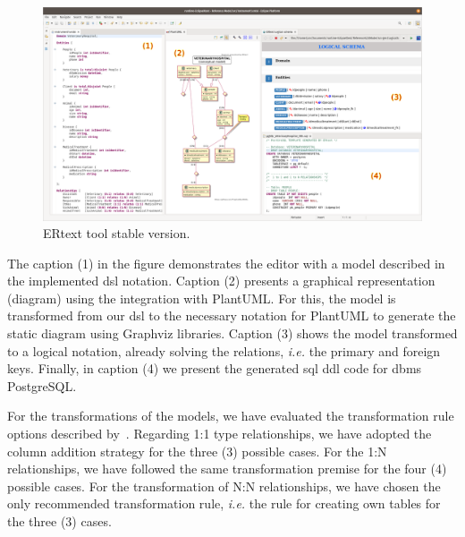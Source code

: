 \begin{figure} [!htb]
    \centering
    \caption{ERtext tool stable version.}
    \label{fig:stableVersion}
    \includegraphics[width=1\textwidth]{img/ToolOverview2.png}
\end{figure}

The caption (1) in the figure demonstrates the editor with a model described in the implemented \ac{dsl} notation.
Caption (2) presents a graphical representation (diagram) using the integration with PlantUML.
For this, the model is transformed from our \ac{dsl} to the necessary notation for PlantUML to generate the static diagram using Graphviz libraries.
Caption (3) shows the model transformed to a logical notation, already solving the relations, \textit{i.e.} the primary and foreign keys.
Finally, in caption (4) we present the generated \ac{sql} \ac{ddl} code for \ac{dbms} PostgreSQL.

For the transformations of the models, we have evaluated the transformation rule options described by~\cite{Heuser:2009}.
Regarding 1:1 type relationships, we have adopted the column addition strategy for the three (3) possible cases.
For the 1:N relationships, we have followed the same transformation premise for the four (4) possible cases.
For the transformation of N:N relationships, we have chosen the only recommended transformation rule, \textit{i.e.} the rule for creating own tables for the three (3) cases.

